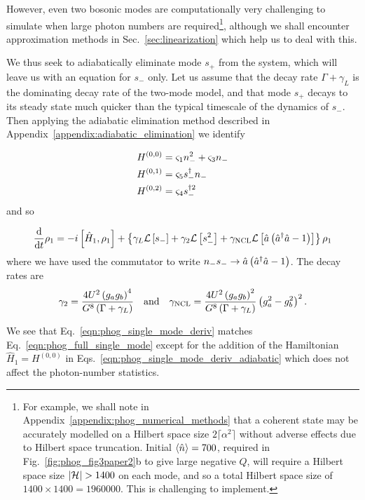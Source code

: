 However, even two bosonic modes are computationally very challenging to simulate when large photon numbers are required\footnote{For example, we shall note in Appendix~\ref{appendix:phog_numerical_methods} that a coherent state may be accurately modelled on a Hilbert space size $2 \lceil \alpha^2 \rceil$ without adverse effects due to Hilbert space truncation. Initial $\ev{\hat{n}} = 700$, required in Fig.~\ref{fig:phog_fig3paper2}b to give large negative $Q$, will require a Hilbert space size $\left|\mathcal{H}\right| > 1400$ on each mode, and so a total Hilbert space size of $1400 \times 1400 = 1960000$. This is challenging to implement.}, although we shall encounter approximation methods in Sec.~\ref{sec:linearization} which help us to deal with this. 

We thus seek to adiabatically eliminate mode $s_+$ from the system, which will leave us with an equation for $s_-$ only. Let us assume that the decay rate $\Gamma + \gamma_L$ is the dominating decay rate of the two-mode model, and that mode $s_+$ decays to its steady state much quicker than the typical timescale of the dynamics of $s_-$. Then applying the adiabatic elimination method described in Appendix~\ref{appendix:adiabatic_elimination} we identify

\begin{align}\label{eqn:phog_single_mode_deriv_adiabatic}
H^{\left(0, 0\right)} &= \varsigma_1 n_-^2 + \varsigma_3 n_- \notag \\ 
%
H^{\left(0, 1\right)} &= \varsigma_5 s_-^\dagger n_- \notag \\
%
H^{\left(0, 2\right)} &= \varsigma_4 s_-^{\dagger 2}
\end{align}
and so

\begin{equation}\label{eqn:phog_single_mode_deriv}
\frac{\mathrm{d}}{\mathrm{d}t} \rho_1 = - i \left[\hat{H}_1, \rho_1\right] + \left\{\gamma_L \mathcal{L}\left[s_-\right] + \gamma_2 \mathcal{L}\left[s_-^2\right] + \gamma_{\text{NCL}} \mathcal{L}\left[\hat{a}\left(\hat{a}^\dagger \hat{a} - 1\right)\right] \right\}\rho_1
\end{equation}
where we have used the commutator to write $n_- s_- \rightarrow \hat{a}\left(\hat{a}^\dagger \hat{a} - 1\right)$. The decay rates are
\begin{equation}\label{eqn:phog_single_mode_decay_rates}
\gamma_2 = \frac{4 U^2 \left(g_a g_b\right)^4}{G^8 \left(\Gamma + \gamma_L\right)} \qq{and} \gncl = \frac{4 U^2 \left(g_a g_b\right)^2}{G^8 \left(\Gamma + \gamma_L\right)}\left(g_a^2 - g_b^2\right)^2.
\end{equation}

\noindent We see that Eq.~\ref{eqn:phog_single_mode_deriv} matches Eq.~\ref{eqn:phog_full_single_mode} except for the addition of the Hamiltonian $\hat{H}_1 = H^{\left(0, 0\right)}$ in Eqs.~\ref{eqn:phog_single_mode_deriv_adiabatic} which does not affect the photon-number statistics. 



